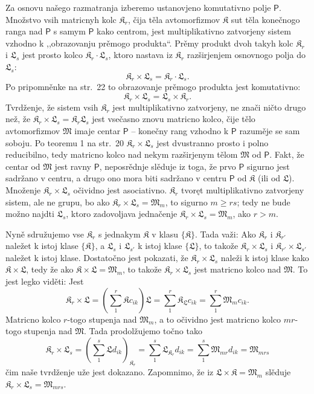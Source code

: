 \documentclass[11pt]{article}
\begin{document}
Za osnovu našego razmatranja izberemo ustanovjeno komutativno polje \(\mathsf P\). Množstvo vsih matricnyh kolc \(\mathfrak K_r\), čija těla avtomorfizmov \(\mathfrak K\) sut těla konečnogo ranga nad \(\mathsf P\) s samym \(\mathsf P\) kako centrom, jest multiplikativno zatvorjeny sistem vzhodno k ,,obrazovanju prěmogo produkta``. Prěmy produkt dvoh takyh kolc \(\mathfrak K_r\) i \(\mathfrak L_s\) jest prosto kolco \(\mathfrak K_r\cdot\mathfrak L_s\), ktoro nastava iz \(\mathfrak K_r\) razširjenjem osnovnogo polja do \(\mathfrak L_s\):
\[
\mathfrak K_r\times\mathfrak L_s=\mathfrak K_r\cdot\mathfrak L_s.
\]
Po pripomněnke na str.~22 to obrazovanje prěmogo produkta jest komutativno:
\[
\mathfrak K_r\times\mathfrak L_s=\mathfrak L_s\times\mathfrak K_r.
\]
Tvrdženje, že sistem vsih \(\mathfrak K_r\) jest multiplikativno zatvorjeny, ne znači ničto drugo než, že \(\mathfrak K_r\times\mathfrak L_s=\mathfrak K_r\mathfrak L_s\) jest vsečasno znovu matricno kolco, čije tělo avtomorfizmov \(\mathfrak M\) imaje centar \(\mathsf P\) -- konečny rang vzhodno k \(\mathsf P\) razuměje se sam soboju. Po teoremu 1 na str.~20 \(\mathfrak K_r\times\mathfrak L_s\) jest dvustranno prosto i polno reducibilno, tedy matricno kolco nad nekym razširjenym tělom \(\mathfrak M\) od \(\mathsf P\). Fakt, že centar od \(\mathfrak M\) jest ravny \(\mathsf P\), neposrědnje slěduje iz toga, že prvo \(\mathsf P\) sigurno jest sadržano v centru, a drugo ono mora biti sadržano v centru \(\mathsf P\) od \(\mathfrak K\) (ili od \(\mathfrak L\)). Množenje \(\mathfrak K_r\times\mathfrak L_s\) očividno jest asociativno. \(\mathfrak K_r\) tvoręt multiplikativno zatvorjeny sistem, ale ne grupu, bo ako \(\mathfrak K_r\times\mathfrak L_s=\mathfrak M_m\), to sigurno \(m\geq rs\); tedy ne bude možno najdti \(\mathfrak L_s\), ktoro zadovoljava jednačenje \(\mathfrak K_r\times\mathfrak L_s=\mathfrak M_m\), ako \(r>m\).

Nyně sdružujemo vse \(\mathfrak K_r\) s jednakym \(\mathfrak K\) v klasu \(\{\mathfrak K\}\). Tada važi: Ako \(\mathfrak K_r\) i \(\mathfrak K_{r'}\) naležet k istoj klase \(\{\mathfrak K\}\), a \(\mathfrak L_s\) i \(\mathfrak L_{s'}\) k istoj klase \(\{\mathfrak L\}\), to takože \(\mathfrak K_r\times\mathfrak L_s\) i \(\mathfrak K_{r'}\times\mathfrak L_{s'}\) naležet k istoj klase. Dostatočno jest pokazati, že \(\mathfrak K_r\times\mathfrak L_s\) naleži k istoj klase kako \(\mathfrak K\times\mathfrak L\), tedy že ako \(\mathfrak K\times\mathfrak L=\mathfrak M_m\), to takože \(\mathfrak K_r\times\mathfrak L_s\) jest matricno kolco nad \(\mathfrak M\). To jest legko viděti: Jest
\[
\mathfrak K_r\times\mathfrak L
=\left(\sum_1^r\mathfrak K c_{ik}\right)\mathfrak L
=\sum_1^r\mathfrak K_{\mathfrak L}c_{ik}
=\sum_1^r\mathfrak M_m c_{ik}.
\]
Matricno kolco \(r\)-togo stupenja nad \(\mathfrak M_m\), a to očividno jest matricno kolco \(mr\)-togo stupenja nad \(\mathfrak M\). Tada prodolžujemo točno tako
\[
\mathfrak K_r\times\mathfrak L_s
=\left(\sum_1^s\mathfrak L d_{ik}\right)_{\mathfrak K_r}
=\sum_1^s\mathfrak L_{\mathfrak K_r}d_{ik}
=\sum_1^s\mathfrak M_{mr}d_{ik}
=\mathfrak M_{mrs}
\]
čim naše tvrdženje uže jest dokazano. Zapomnimo, že iz \(\mathfrak L\times\mathfrak K=\mathfrak M_m\) slěduje \(\mathfrak K_r\times\mathfrak L_s=\mathfrak M_{mrs}\).
\end{document}
